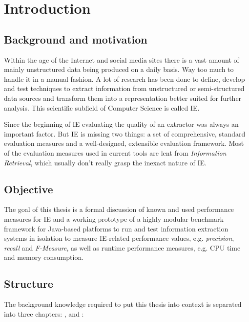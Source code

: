 \section{Introduction}

\subsection{Background and motivation}
Within the age of the Internet and social media sites there is a vast amount of mainly unstructured data being produced on a daily basis. Way too much to handle it in a manual fashion. A lot of research has been done to define, develop and test techniques to extract information from unstructured or semi-structured data sources and transform them into a representation better suited for further analysis. This scientific subfield of Computer Science is called \gls{IE}.

Since the beginning of \gls{IE} evaluating the quality of an extractor was always an important factor. But \gls{IE} is missing two things: a set of comprehensive, standard evaluation measures and a well-designed, extensible evaluation framework. Most of the evaluation measures used in current tools are lent from \textit{Information Retrieval}, which usually don't really grasp the inexact nature of \gls{IE}.


\subsection{Objective}
The goal of this thesis is a formal discussion of known and used performance measures for IE and a working prototype of a highly modular benchmark framework for Java-based platforms to run and test information extraction systems in isolation to measure IE-related performance values, e.g. \textit{precision}, \textit{recall} and \textit{F-Measure}, as well as runtime performance measures, e.g. CPU time and memory consumption.


\subsection{Structure}
The background knowledge required to put this thesis into context is separated into three chapters: ,  and :


